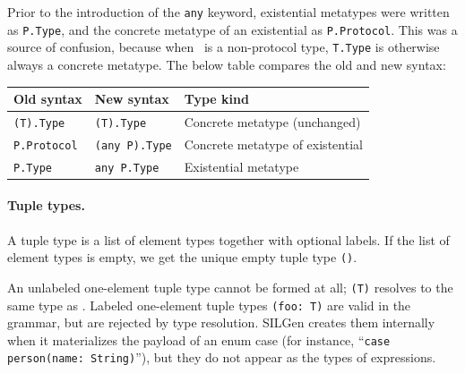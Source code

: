\documentclass[../generics]{subfiles}
\begin{document}
Prior to the introduction of the \texttt{any} keyword, existential metatypes were written as \texttt{P.Type}, and the concrete metatype of an existential as \texttt{P.Protocol}. This was a source of confusion, because when \tT\ is a non-protocol type, \texttt{T.Type} is otherwise always a concrete metatype. The below table compares the old and new syntax:
\begin{center}
\begin{tabular}{lll}
\toprule
\textbf{Old syntax}&\textbf{New syntax}&\textbf{Type kind}\\
\midrule
\texttt{(T).Type}&\texttt{(T).Type}&Concrete metatype (unchanged)\\
\texttt{P.Protocol}&\texttt{(any P).Type}&Concrete metatype of existential\\
\texttt{P.Type}&\texttt{any P.Type}&Existential metatype\\
\bottomrule
\end{tabular}
\end{center}

\begin{figure}
\begin{center}
\end{center}
\end{figure}

\paragraph{Tuple types.}
A tuple type is a list of element types together with optional labels. If the list of element types is empty, we get the unique empty tuple type \texttt{()}.

An unlabeled one-element tuple type cannot be formed at all; \texttt{(T)} resolves to the same type as \tT. Labeled one-element tuple types \texttt{(foo:\ T)} are valid in the grammar, but are rejected by type resolution. SILGen creates them internally when it materializes the payload of an enum case (for instance, ``\texttt{case person(name:\ String)}''), but they do not appear as the types of expressions.
\end{document}
